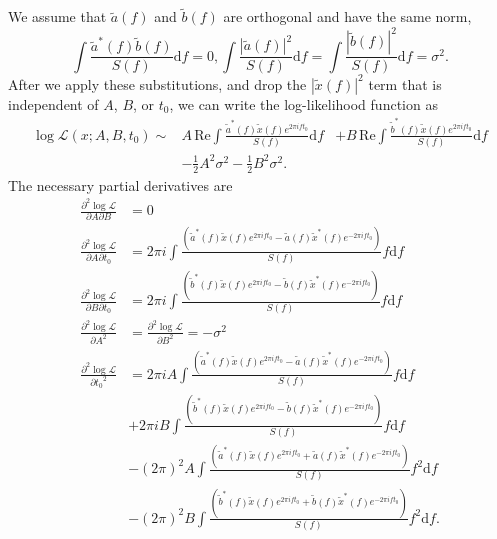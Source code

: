 \documentclass{iopart}
\begin{document}
%
We assume that $\tilde{a}(f)$ and $\tilde{b}(f)$ are orthogonal and have the same norm,
%
\begin{equation}
	\int \frac{\tilde{a}^*(f) \tilde{b}(f)}{S(f)} \mathrm{d}f = 0,
	\int \frac{|\tilde{a}(f)|^2}{S(f)} \mathrm{d}f =
	\int \frac{|\tilde{b}(f)|^2}{S(f)} \mathrm{d}f =
	\sigma^2.
\end{equation}
%
After we apply these substitutions, and drop the $|\tilde{x}(f)|^2$ term that is independent of $A$, $B$, or $t_0$, we can write the log\nobreakdashes-likelihood function as
%
\begin{eqnarray}\label{eq:trigger-likelihood-simplified}
	\log \mathcal{L}(x; A, B, t_0) \sim
	& A \, \mathrm{Re} \int \frac{\tilde{a}^*(f) \tilde{x}(f) e^{2 \pi i f t_0}}{S(f)} \mathrm{d}f 
	&+ B \, \mathrm{Re} \int \frac{\tilde{b}^*(f) \tilde{x}(f) e^{2 \pi i f t_0} }{S(f)} \mathrm{d}f\nonumber\\
	&- \frac{1}{2} A^2 \sigma^2 - \frac{1}{2} B^2 \sigma^2.
\end{eqnarray}
%
The necessary partial derivatives are
%
\begin{eqnarray*}
	\frac{\partial^2 \log \mathcal{L}}{\partial A \partial B} &= 0 \\
	\frac{\partial^2 \log \mathcal{L}}{\partial A \partial t_0} &=
	2 \pi i \int \frac{\left(\tilde{a}^*(f) \tilde{x}(f) e^{2 \pi i f t_0} - \tilde{a}(f) \tilde{x}^*(f) e^{-2 \pi i f t_0}\right)}{S(f)} f \mathrm{d}f \\
	\frac{\partial^2 \log \mathcal{L}}{\partial B \partial t_0} &=
	2 \pi i \int \frac{\left(\tilde{b}^*(f) \tilde{x}(f) e^{2 \pi i f t_0} - \tilde{b}(f) \tilde{x}^*(f) e^{-2 \pi i f t_0}\right)}{S(f)} f \mathrm{d}f \\
	\frac{\partial^2 \log \mathcal{L}}{\partial A^2} &=
	\frac{\partial^2 \log \mathcal{L}}{\partial B^2} = - \sigma^2 \\
	\frac{\partial^2 \log \mathcal{L}}{\partial {t_0}^2} &=
	2 \pi i A \int \frac{\left(\tilde{a}^*(f) \tilde{x}(f) e^{2 \pi i f t_0} - \tilde{a}(f) \tilde{x}^*(f) e^{-2 \pi i f t_0}\right)}{S(f)} f \mathrm{d}f \\
	&+ 2 \pi i B \int \frac{\left(\tilde{b}^*(f) \tilde{x}(f) e^{2 \pi i f t_0} - \tilde{b}(f) \tilde{x}^*(f) e^{-2 \pi i f t_0}\right)}{S(f)} f \mathrm{d}f \\
	&- (2 \pi)^2 A \int \frac{\left(\tilde{a}^*(f) \tilde{x}(f) e^{2 \pi i f t_0} + \tilde{a}(f) \tilde{x}^*(f) e^{-2 \pi i f t_0}\right)}{S(f)} f^2 \mathrm{d}f \\
	&- (2 \pi)^2 B \int \frac{\left(\tilde{b}^*(f) \tilde{x}(f) e^{2 \pi i f t_0} + \tilde{b}(f) \tilde{x}^*(f) e^{-2 \pi i f t_0}\right)}{S(f)} f^2 \mathrm{d}f.
\end{eqnarray*}
\end{document}
